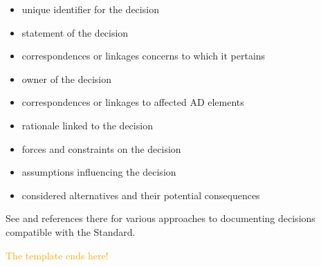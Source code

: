 \documentclass[10pt,oneside]{report}
\begin{document}
\begin{itemize}
\item unique identifier for the decision 
\item statement of the decision
\item correspondences or linkages concerns to which it pertains
\item owner of the decision
\item correspondences or linkages to affected AD elements
\item rationale linked to the decision
\item forces and constraints on the decision
\item assumptions influencing the decision
\item considered alternatives and their potential consequences
\end{itemize}

See \cite{DFAD:2011} and references there for various
approaches to documenting decisions compatible with the Standard.


\center\textcolor{Orange}{\Large The template ends here!}


\printbibliography

% 


\newpage
\tableofcontents
\end{document}
